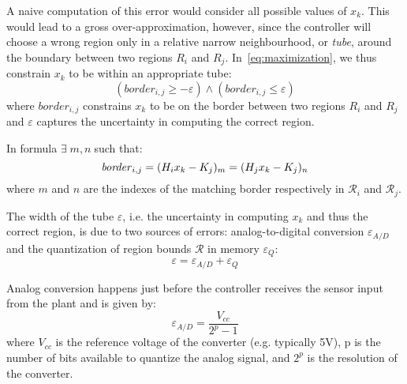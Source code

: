 
A naive computation of this error would consider all possible values of $x_k$.
This would lead to a gross over-approximation, however, since the controller
will choose a wrong region only in a relative narrow neighbourhood, or
\emph{tube}, around the boundary between two regions $R_i$ and $R_j$.
In~\autoref{eq:maximization}, we thus constrain $x_k$ to be within an appropriate tube:
\begin{equation}\label{eq:tube}
(\mathit{border}_{i,j} \ge -\varepsilon) \land (\mathit{border}_{i,j} \le \varepsilon)
\end{equation}
where $\mathit{border}_{i,j}$ constrains $x_k$ to be on the border between two regions
$R_i$ and $R_j$ and $\varepsilon$ captures the uncertainty in computing the
correct region.

In formula $\exists\; m,n \;$such that:
\begin{equation}
\mathit{border}_{i,j}=(H_{i}x_{k}-K_{j})_{m} = (H_{j}x_{k}-K_{j})_{n}
\end{equation}
where $m$ and $n$ are the indexes of the matching border respectively in $\mathcal{R}_{i}$ and $\mathcal{R}_{j}$.

The width of the tube $\varepsilon$, i.e. the uncertainty in computing $x_k$ and
thus the correct region, is due to two sources of errors: analog-to-digital
conversion $\varepsilon_{A/D}$ and the quantization of region bounds
$\mathcal{R}$ in memory $\varepsilon_{Q}$:
\begin{equation}\label{eq:epsilontot}
  \varepsilon=\varepsilon_{A/D}+\varepsilon_{Q}
\end{equation}

Analog conversion happens just before the controller receives the sensor input from the plant
and is given by:
\begin{equation*}
\varepsilon_{A/D}=\frac{V_{cc}}{2^{p}-1}
\end{equation*}
where $V_{cc}$ is the reference voltage of the converter (e.g. typically 5V), p is the number of bits available to quantize the analog signal, and $2^{p}$ is the resolution of the converter.

